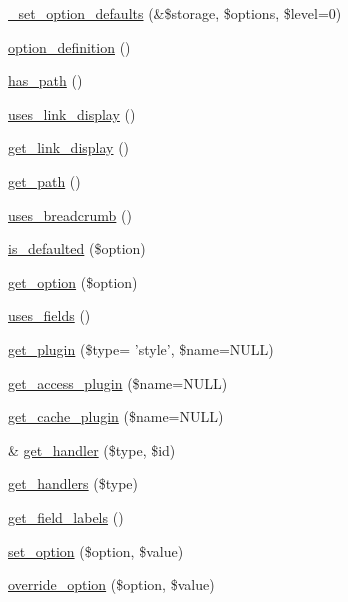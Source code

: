 \begin{CompactItemize}
\hyperlink{classviews__plugin__display_788afea5209b04183d46460349e8a2a4}{\_\-set\_\-option\_\-defaults} (\&\$storage, \$options, \$level=0)
\item 
\hyperlink{classviews__plugin__display_6eb433a3ccd4225c11b54955d86e2e01}{option\_\-definition} ()
\item 
\hyperlink{classviews__plugin__display_08fe612e61fe35f549f0ec9a1fe8d953}{has\_\-path} ()
\item 
\hyperlink{classviews__plugin__display_64d6d3c0e51efde2e050d36fbd3457dc}{uses\_\-link\_\-display} ()
\item 
\hyperlink{classviews__plugin__display_97a467c1f9faecd9f1ca60f83e1193d2}{get\_\-link\_\-display} ()
\item 
\hyperlink{classviews__plugin__display_c9a045f84e31fbe0513482170bd61c01}{get\_\-path} ()
\item 
\hyperlink{classviews__plugin__display_b3d2779948700bcc6c5ee3b26726f468}{uses\_\-breadcrumb} ()
\item 
\hyperlink{classviews__plugin__display_8f5676603ce803078ea100a5781bfbd6}{is\_\-defaulted} (\$option)
\item 
\hyperlink{classviews__plugin__display_d2a856f65cb78867204d4f7f877b2972}{get\_\-option} (\$option)
\item 
\hyperlink{classviews__plugin__display_2476af1c5eb02a69a5a94d0e2f391987}{uses\_\-fields} ()
\item 
\hyperlink{classviews__plugin__display_7a38d9a80eed86c5c00f7d66002fbf8d}{get\_\-plugin} (\$type= 'style', \$name=NULL)
\item 
\hyperlink{classviews__plugin__display_e39592a8c4f13e521fe9f5e7f8aa2296}{get\_\-access\_\-plugin} (\$name=NULL)
\item 
\hyperlink{classviews__plugin__display_726c2caab760f24278e7745b06064d32}{get\_\-cache\_\-plugin} (\$name=NULL)
\item 
\& \hyperlink{classviews__plugin__display_f76b2461cd87d7965a442bae077aa772}{get\_\-handler} (\$type, \$id)
\item 
\hyperlink{classviews__plugin__display_8ca4ff604c846359bfce009a75a264be}{get\_\-handlers} (\$type)
\item 
\hyperlink{classviews__plugin__display_a519531ff1725cb9211c04cc9cfc3679}{get\_\-field\_\-labels} ()
\item 
\hyperlink{classviews__plugin__display_5a0689b3004e556b51b054062a8467c6}{set\_\-option} (\$option, \$value)
\item 
\hyperlink{classviews__plugin__display_1f5eb1e77d0e8754f0ae0e8092cc2190}{override\_\-option} (\$option, \$value)

\end{CompactItemize}

